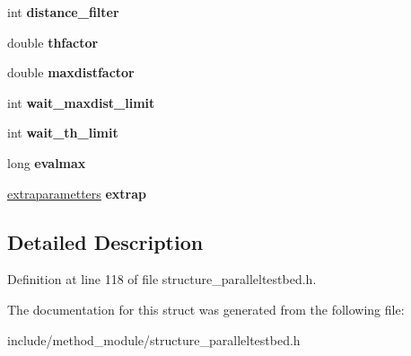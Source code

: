 \begin{DoxyCompactItemize}
\item 
\hypertarget{structlocal__options_a43ad3d890e645c048445ae0d42e41907}{int {\bfseries distance\-\_\-filter}}\label{structlocal__options_a43ad3d890e645c048445ae0d42e41907}

\item 
\hypertarget{structlocal__options_a1474da14d2882cd44e47d0cb298b1bfc}{double {\bfseries thfactor}}\label{structlocal__options_a1474da14d2882cd44e47d0cb298b1bfc}

\item 
\hypertarget{structlocal__options_a5bd1760a09b0ec91b5e2b6bf17db5a7c}{double {\bfseries maxdistfactor}}\label{structlocal__options_a5bd1760a09b0ec91b5e2b6bf17db5a7c}

\item 
\hypertarget{structlocal__options_a0904213be6e8addbb9128d54e69108c8}{int {\bfseries wait\-\_\-maxdist\-\_\-limit}}\label{structlocal__options_a0904213be6e8addbb9128d54e69108c8}

\item 
\hypertarget{structlocal__options_a94abc7feca3525cc2e11d2bcb43a90ce}{int {\bfseries wait\-\_\-th\-\_\-limit}}\label{structlocal__options_a94abc7feca3525cc2e11d2bcb43a90ce}

\item 
\hypertarget{structlocal__options_a9d5750be9c445cd56261fcc383468d31}{long {\bfseries evalmax}}\label{structlocal__options_a9d5750be9c445cd56261fcc383468d31}

\item 
\hypertarget{structlocal__options_abd9f016d989ef2d3882771169dcb2693}{\hyperlink{structextraparametters}{extraparametters} {\bfseries extrap}}\label{structlocal__options_abd9f016d989ef2d3882771169dcb2693}

\end{DoxyCompactItemize}


\subsection{Detailed Description}


Definition at line 118 of file structure\-\_\-paralleltestbed.\-h.



The documentation for this struct was generated from the following file\-:\begin{DoxyCompactItemize}
\item 
include/method\-\_\-module/structure\-\_\-paralleltestbed.\-h\end{DoxyCompactItemize}
